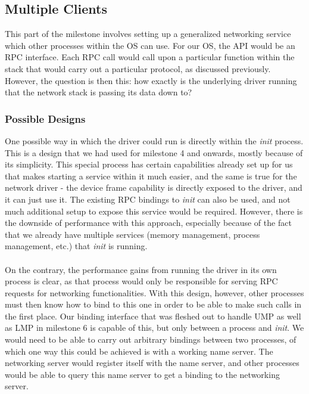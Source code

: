 \subsection{Multiple Clients}
This part of the milestone involves setting up a generalized networking service which other processes within the OS can use. For our OS, the API would be an RPC interface. Each RPC call would call upon a particular function within the stack that would carry out a particular protocol, as discussed previously. However, the question is then this: how exactly is the underlying driver running that the network stack is passing its data down to?

\subsubsection{Possible Designs}
One possible way in which the driver could run is directly within the \textit{init} process. This is a design that we had used for milestone 4 and onwards, mostly because of its simplicity. This special process has certain capabilities already set up for us that makes starting a service within it much easier, and the same is true for the network driver - the device frame capability is directly exposed to the driver, and it can just use it. The existing RPC bindings to \textit{init} can also be used, and not much additional setup to expose this service would be required. However, there is the downside of performance with this approach, especially because of the fact that we already have multiple services (memory management, process management, etc.) that \textit{init} is running.
\\\\
On the contrary, the performance gains from running the driver in its own process is clear, as that process would only be responsible for serving RPC requests for networking functionalities. With this design, however, other processes must then know how to bind to this one in order to be able to make such calls in the first place. Our binding interface that was fleshed out to handle UMP as well as LMP in milestone 6 is capable of this, but only between a process and \textit{init}. We would need to be able to carry out arbitrary bindings between two processes, of which one way this could be achieved is with a working name server. The networking server would register itself with the name server, and other processes would be able to query this name server to get a binding to the networking server.

